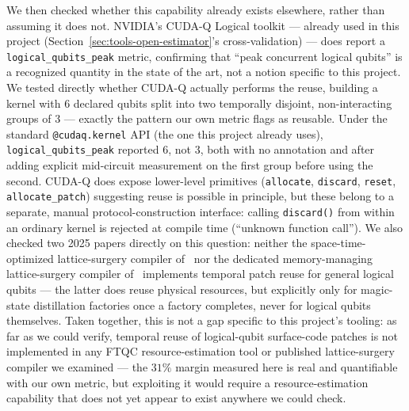 \documentclass[9pt,twocolumn]{extarticle}
\begin{document}
We then checked whether this capability already exists elsewhere, rather
than assuming it does not. NVIDIA's CUDA-Q Logical toolkit --- already
used in this project (Section~\ref{sec:tools-open-estimator}'s
cross-validation) --- does report a \texttt{logical\_qubits\_peak} metric,
confirming that ``peak concurrent logical qubits'' is a recognized
quantity in the state of the art, not a notion specific to this project.
We tested directly whether CUDA-Q actually performs the reuse, building a
kernel with 6 declared qubits split into two temporally disjoint,
non-interacting groups of 3 --- exactly the pattern our own metric flags
as reusable. Under the standard \texttt{@cudaq.kernel} API (the one this
project already uses), \texttt{logical\_qubits\_peak} reported $6$, not
$3$, both with no annotation and after adding explicit mid-circuit
measurement on the first group before using the second. CUDA-Q does expose
lower-level primitives (\texttt{allocate}, \texttt{discard}, \texttt{reset},
\texttt{allocate\_patch}) suggesting reuse is possible in principle, but
these belong to a separate, manual protocol-construction interface:
calling \texttt{discard()} from within an ordinary kernel is rejected at
compile time (``unknown function call''). We also checked two 2025
papers directly on this question: neither the space-time-optimized
lattice-surgery compiler of~\cite{spacetimeopt2025} nor the dedicated
memory-managing lattice-surgery compiler of~\cite{latticesurgerycompiler2025}
implements temporal patch reuse for general logical qubits --- the latter
does reuse physical resources, but explicitly only for magic-state
distillation factories once a factory completes, never for logical qubits
themselves. Taken together, this is not a gap specific to this project's
tooling: as far as we could verify, temporal reuse of logical-qubit
surface-code patches is not implemented in any FTQC resource-estimation
tool or published lattice-surgery compiler we examined --- the $31\%$
margin measured here is real and quantifiable with our own metric, but
exploiting it would require a resource-estimation capability that does
not yet appear to exist anywhere we could check.
\end{document}
